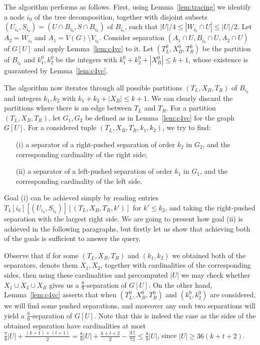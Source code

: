 \documentclass[a4paper,11pt]{article}
\theoremstyle{definition}
\theoremstyle{remark}
\begin{document}
The algorithm performs as follows.  First, using
Lemma~\ref{lem:tracing} we identify a node $i_0$ of the tree
decomposition, together with disjoint subsets
$(U_{i_0},S_{i_0})=(U\cap B_{i_0},S\cap B_{i_0})$ of $B_{i_0}$, such
that $ |U|/4\leq |W_{i_0}\cap U|\leq |U|/2$.  Let $A_2=W_{i_0}$ and
$A_1=V(G)\setminus V_{i_0}$.  Consider separation $(A_1\cap
U,B_{i_0}\cap U,A_2\cap U)$ of $G[U]$ and apply Lemma~\ref{lem:c4vc}
to it.  Let $(T^0_L,X^0_B,T^0_R)$ be the partition of $B_{i_0}$ and
$k^0_1,k^0_2$ be the integers with $k^0_1+k^0_2+|X^0_B|\leq k+1$, whose
existence is guaranteed by Lemma~\ref{lem:c4vc}.

The algorithm now iterates through all possible partitions
$(T_L,X_B,T_R)$ of $B_{i_0}$ and integers $k_1,k_2$ with
$k_1+k_2+|X_B|\leq k+1$.  We can clearly discard the partitions where
there is an edge between $T_L$ and $T_R$.  For a partition
$(T_L,X_B,T_R)$, let $G_1,G_2$ be defined as in Lemma~\ref{lem:c4vc}
for the graph $G[U]$.  For a considered tuple $(T_L,X_B,T_R,k_1,k_2)$,
we try to find:
\begin{itemize}
\item[(i)] a separator of a right-pushed separation of order $k_2$ in
  $G_2$, and the corresponding cardinality of the right side;
\item[(ii)] a separator of a left-pushed separation of order $k_1$ in
  $G_1$, and the corresponding cardinality of the left side.
\end{itemize}
Goal (i) can be achieved simply by reading entries
$T_4[i_0][(U_{i_0},S_{i_0})][(T_L,X_B,T_R,k')]$ for $k'\leq k_2$, and
taking the right-pushed separation with the largest right side.  We
are going to present how goal (ii) is achieved in the following
paragraphs, but firstly let us show that achieving both of the goals
is sufficient to answer the query.

Observe that if for some $(T_L,X_B,T_R)$ and $(k_1,k_2)$ we obtained
both of the separators, denote them $X_1,X_2$, together with
cardinalities of the corresponding sides, then using these
cardinalities and precomputed $|U|$ we may check whether $X_1\cup
X_2\cup X_B$ gives us a $\frac{8}{9}$-separation of $G[U]$.  On the
other hand, Lemma~\ref{lem:c4vc} asserts that when
$(T^0_L,X^0_B,T^0_R)$ and $(k^0_1,k^0_2)$ are considered, we will find
some pushed separations, and moreover any such two separations will
yield a $\frac{8}{9}$-separation of $G[U]$.  Note that this is indeed
the case as the sides of the obtained separation have cardinalities at
most $\frac{7}{8}|U|+\frac{(k+1)+(t+1)}{2}=\frac{8}{9}|U|+\frac{k+t+2}{2}-\frac{|U|}{72}\leq
\frac{8}{9}|U|$, since $|U|\geq 36(k+t+2)$.
\end{document}
